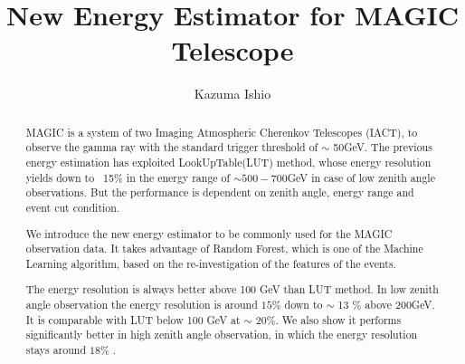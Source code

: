 \documentclass[preprint,12pt,authoryear]{elsarticle}
\begin{document}
\begin{frontmatter}



\title{New Energy Estimator for MAGIC Telescope }


\author{Kazuma Ishio}

\address{}

\begin{abstract}
MAGIC is a system of two Imaging Atmospheric Cherenkov Telescopes (IACT), to observe the gamma ray with the standard trigger threshold of  $\sim$ 50GeV. 
The previous energy estimation has exploited LookUpTable(LUT) method, whose energy resolution yields down to ~15\% in the energy range of   $\sim 500 - 700 $GeV in case of low zenith angle observations. But the performance is dependent on zenith angle, energy range and event cut condition. 

We introduce the new energy estimator to be commonly used for the MAGIC observation data. It takes advantage of Random Forest, which is one of the Machine Learning algorithm, based on the re-investigation of the features of the events.

The energy resolution is always better above 100 GeV than LUT method. In low zenith angle observation the energy resolution is around $15 \%$ down to $\sim$ 13 $\%$ above 200GeV. It is comparable with LUT below 100 GeV at $\sim$ $20 \%$.  
We also show it performs significantly better in high zenith angle observation, in which the energy resolution stays around $18 \%$ .



\end{abstract}
\end{frontmatter}
\end{document}
